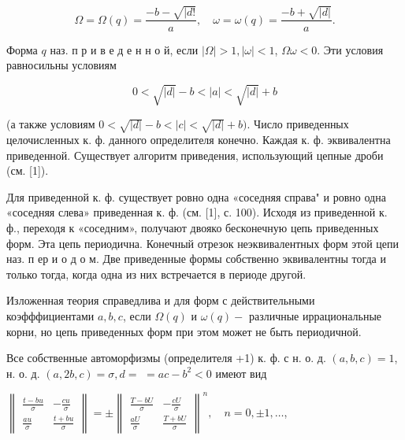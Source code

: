 \documentclass[10pt]{article}
\begin{document}
\[

\Omega=\Omega(q)=\frac{-b-\sqrt{\mid d !}}{a}, \quad \omega=\omega(q)=\frac{-b+\sqrt{|d|}}{a} .

\]



Форма $q$ наз. п р и в е д е н н о й, если $|\Omega|>1,|\omega|<1$, $\Omega \omega<0$. Эти условия равносильны условиям



\[

0<\sqrt{|d|}-b<|a|<\sqrt{|d|}+b

\]



(а также условиям $0<\sqrt{|d|}-b<|c|<\sqrt{|d|}+b)$. Число приведенных целочисленных к. ф. данного определителя конечно. Каждая к. ф. эквивалентна приведенной. Существует алгоритм приведения, использующий цепные дроби (см. [1]).



Для приведенной к. ф. существует ровно одна «соседняя справа" и ровно одна «соседняя слева» приведенная к. ф. (см. [1], с. 100). Исходя из приведенной к. ф., переходя к «соседним», получают двояко бесконечную цепь приведенных форм. Эта цепь периодична. Конечный отрезок неэквивалентных форм этой цепи наз. п ер и о д о м. Две приведенные формы собственно эквивалентны тогда и только тогда, когда одна из них встречается в периоде другой.



Изложенная теория справедлива и для форм с действительными коэфффициентами $a, b, c$, если $\Omega(q)$ и $\omega(q)-$ различные иррациональные корни, но цепь приведенных форм при этом может не быть периодичной.



Все собственные автоморфизмы (определителя +1) к. ф. с н. о. д. $(a, b, c)=1$, н. о. д. $(a, 2 b, c)=\sigma, d=$ $=a c-b^{2}<0$ имеют вид



$\left\|\begin{array}{cc}\frac{t-b u}{\sigma} & -\frac{c u}{\sigma} \\ \frac{a u}{\sigma} & \frac{t+b u}{\sigma}\end{array}\right\|= \pm\left\|\begin{array}{cc}\frac{T-b U}{\sigma} & -\frac{c U}{\sigma} \\ \frac{a U}{\sigma} & \frac{T+b U}{\sigma}\end{array}\right\|^{n}, \quad n=0, \pm 1, \ldots$,
\end{document}
